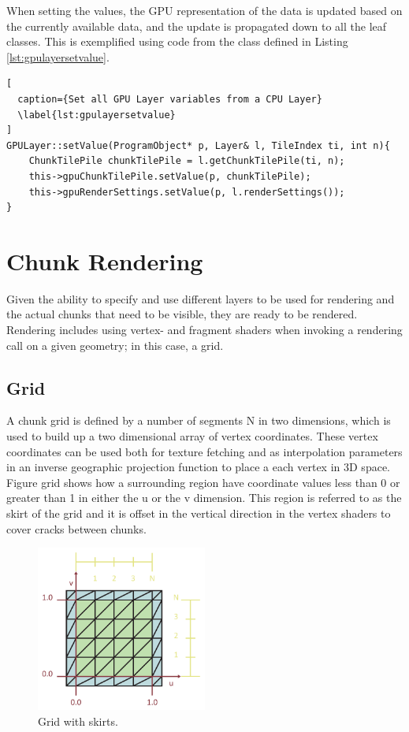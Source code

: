 When setting the values, the GPU representation of the data is updated based on the currently available  data, and the update is propagated down to all the leaf classes. This is exemplified using code from the  class defined in Listing \ref{lst:gpulayersetvalue}.

\begin{lstlisting}[
  caption={Set all GPU Layer variables from a CPU Layer} 
  \label{lst:gpulayersetvalue}
]
GPULayer::setValue(ProgramObject* p, Layer& l, TileIndex ti, int n){
	ChunkTilePile chunkTilePile = l.getChunkTilePile(ti, n);
	this->gpuChunkTilePile.setValue(p, chunkTilePile);
	this->gpuRenderSettings.setValue(p, l.renderSettings());
}
\end{lstlisting}

\section{Chunk Rendering}

Given the ability to specify and use different layers to be used for rendering and the actual chunks that need to be visible, they are ready to be rendered. Rendering includes using vertex- and fragment shaders when invoking a rendering call on a given geometry; in this case, a grid.

\subsection{Grid}

A chunk grid is defined by a number of segments N in two dimensions, which is used to build up a two dimensional array of vertex coordinates. These vertex coordinates can be used both for texture fetching and as interpolation parameters in an inverse geographic projection function to place a each vertex in 3D space. Figure grid shows how a surrounding region have coordinate values less than 0 or greater than 1 in either the u or the v dimension. This region is referred to as the skirt of the grid and it is offset in the vertical direction in the vertex shaders to cover cracks between chunks.

\begin{figure}[htbp]
    \centering
    \includegraphics[width=0.5\textwidth]{figures/implementation/rendering/grid.pdf}
    \caption{Grid with skirts.}
    \label{fig:grid}
\end{figure}

